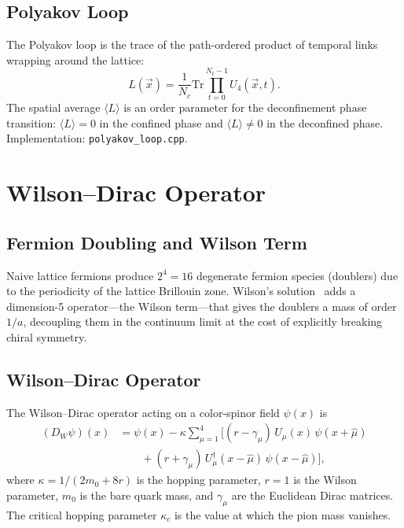 \documentclass[12pt]{article}
\newcommand{\Tr}{\mathrm{Tr}}
\newcommand{\code}[1]{\texttt{#1}}
\begin{document}
\subsection{Polyakov Loop}

The Polyakov loop is the trace of the path-ordered product of temporal links wrapping around the lattice:
\begin{equation}
L(\vec{x}) = \frac{1}{N_c} \Tr \prod_{t=0}^{N_t - 1} U_4(\vec{x}, t).
\end{equation}
The spatial average $\langle L \rangle$ is an order parameter for the deconfinement phase transition: $\langle L \rangle = 0$ in the confined phase and $\langle L \rangle \neq 0$ in the deconfined phase. Implementation: \code{polyakov\_loop.cpp}.


\section{Wilson--Dirac Operator}
\label{sec:wilson_dirac}

\subsection{Fermion Doubling and Wilson Term}

Naive lattice fermions produce $2^4 = 16$ degenerate fermion species (doublers) due to the periodicity of the lattice Brillouin zone. Wilson's solution~\cite{Wilson1977} adds a dimension-5 operator---the Wilson term---that gives the doublers a mass of order $1/a$, decoupling them in the continuum limit at the cost of explicitly breaking chiral symmetry.

\subsection{Wilson--Dirac Operator}

The Wilson--Dirac operator acting on a color-spinor field $\psi(x)$ is
\begin{align}
\label{eq:wilson_dirac}
(D_W \psi)(x) &= \psi(x) - \kappa \sum_{\mu=1}^{4} \Big[
(r - \gamma_\mu) \, U_\mu(x) \, \psi(x + \hat{\mu}) \nonumber \\
&\quad\quad + (r + \gamma_\mu) \, U_\mu^\dagger(x - \hat{\mu}) \, \psi(x - \hat{\mu})
\Big],
\end{align}
where $\kappa = 1/(2m_0 + 8r)$ is the hopping parameter, $r = 1$ is the Wilson parameter, $m_0$ is the bare quark mass, and $\gamma_\mu$ are the Euclidean Dirac matrices. The critical hopping parameter $\kappa_c$ is the value at which the pion mass vanishes.
\end{document}
